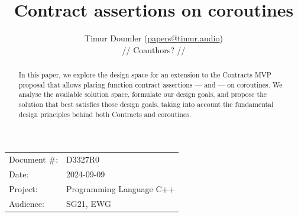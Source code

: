 

 \usepackage[bottom]{footmisc} 

 \usepackage{longtable}


\usepackage{tikz,lipsum,lmodern}
\usepackage[most]{tcolorbox}




\title{Contract assertions on coroutines}
\author{ Timur Doumler \small(\href{mailto:papers@timur.audio}{papers@timur.audio}) \\
// Coauthors? //
}
\date{}
\maketitle

\begin{tabular}{ll}
Document \#: & D3327R0 \\
Date: &2024-09-09 \\
Project: & Programming Language C++ \\
Audience: & SG21, EWG
\end{tabular}

\begin{abstract}
In this paper, we explore the design space for an extension to the Contracts MVP proposal \cite{P2900R8} that allows placing function contract assertions ---  and 
 --- on coroutines. We analyse the available solution space, formulate our design goals, and propose the solution that best satisfies those design goals, taking into account the fundamental design principles behind both Contracts and coroutines.
\end{abstract}






